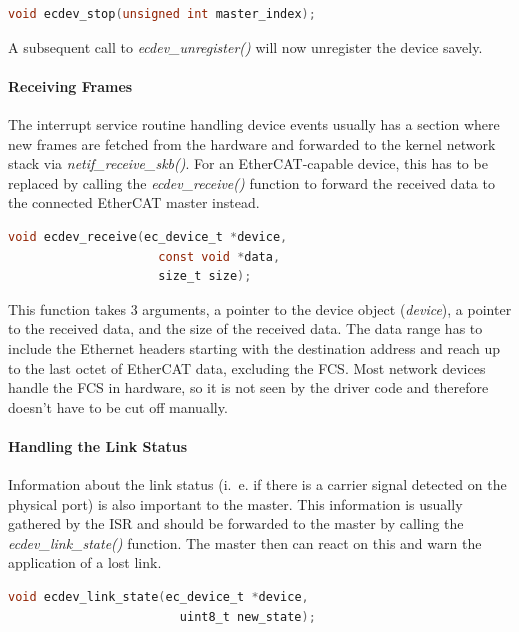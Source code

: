 \documentclass[a4paper,12pt,BCOR6mm,bibtotoc,idxtotoc]{scrbook}
\begin{document}
\begin{lstlisting}[gobble=2,language=C]
  void ecdev_stop(unsigned int master_index);
\end{lstlisting}

A subsequent call to \textit{ecdev\_unregister()} will now unregister
the device savely.

\paragraph{Receiving Frames}

The interrupt service routine handling device events usually has a
section where new frames are fetched from the hardware and forwarded
to the kernel network stack via \textit{netif\_receive\_skb()}. For an
EtherCAT-capable device, this has to be replaced by calling the
\textit{ecdev\_receive()} function to forward the received data to the
connected EtherCAT master instead.

\begin{lstlisting}[gobble=2,language=C]
  void ecdev_receive(ec_device_t *device,
                     const void *data,
                     size_t size);
\end{lstlisting}

This function takes 3 arguments, a pointer to the device object
(\textit{device}), a pointer to the received data, and the size of the
received data. The data range has to include the Ethernet headers
starting with the destination address and reach up to the last octet
of EtherCAT data, excluding the FCS. Most network devices handle the
FCS in hardware, so it is not seen by the driver code and therefore
doesn't have to be cut off manually.

\paragraph{Handling the Link Status}

Information about the link status (i.~e. if there is a carrier signal detected
on the physical port) is also important to the master. This information is
usually gathered by the ISR and should be forwarded to the master by calling
the \textit{ecdev\_link\_state()} function. The master then can react on this
and warn the application of a lost link.

\begin{lstlisting}[gobble=2,language=C]
  void ecdev_link_state(ec_device_t *device,
                        uint8_t new_state);
\end{lstlisting}
\end{document}
